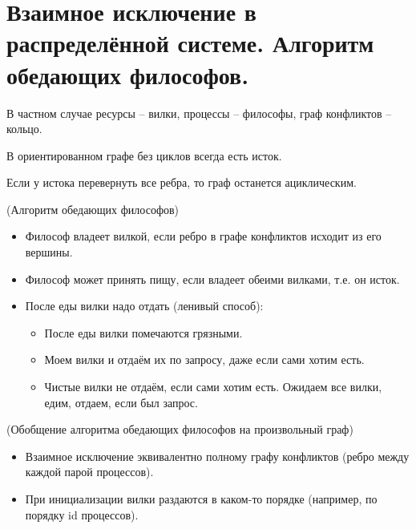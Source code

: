 \section{Взаимное исключение в распределённой системе. Алгоритм обедающих философов.}

\begin{definition}
    В частном случае ресурсы -- вилки, процессы -- философы, граф конфликтов -- кольцо.
\end{definition}

\begin{theorem}
    В ориентированном графе без циклов всегда есть исток.
\end{theorem}

\begin{theorem}
    Если у истока перевернуть все ребра, то граф останется ациклическим.
\end{theorem}

\begin{algorithm}(Алгоритм обедающих философов)
\begin{itemize}
    \item Философ владеет вилкой, если ребро в графе конфликтов исходит из его вершины.
    \item Философ может принять пищу, если владеет обеими вилками, т.е. он исток.
    \item После еды вилки надо отдать (ленивый способ):
        \begin{itemize}
            \item После еды вилки помечаются грязными.
            \item Моем вилки и отдаём их по запросу, даже если сами хотим есть.
            \item Чистые вилки не отдаём, если сами хотим есть. Ожидаем все вилки, 
                едим, отдаем, если был запрос.
        \end{itemize}
\end{itemize}
\end{algorithm}

\begin{algorithm}(Обобщение алгоритма обедающих философов на произвольный граф)
\begin{itemize}
    \item Взаимное исключение эквивалентно полному графу конфликтов (ребро
        между каждой парой процессов).
    \item При инициализации вилки раздаются в каком-то порядке (например,
        по порядку id процессов).
\end{itemize}
\end{algorithm}

